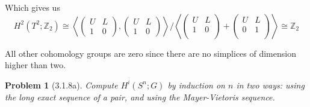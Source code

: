\documentclass[10pt]{article}
\newcommand{\sk}{\vskip 10mm}
\newcommand{\bb}[1]{\mathbb{#1}}
\theoremstyle{plain}
\newtheorem{problem}{Problem}
\theoremstyle{remark}
\begin{document}
Which gives us
\[
  H^2(T^2;\bb{Z}_2)\cong 
  \left\langle
    \left(
      \begin{array}{cc}
        U&L\\
        1&0
      \end{array}
    \right),
    \left(
      \begin{array}{cc}
        U&L\\
        1&0
      \end{array}
    \right)
  \right\rangle
  /
  \left\langle
    \left(
      \begin{array}{cc}
        U&L\\
        1&0\\
      \end{array}
    \right)
    +
    \left(
      \begin{array}{cc}
        U&L\\
        0&1\\
      \end{array}
    \right)
  \right\rangle
  \cong \bb{Z}_2
\]

All other cohomology groups are zero since there are no simplices
of dimension higher than two.

\sk

\begin{problem}[3.1.8a]
  Compute $H^i(S^n;G)$ by induction on $n$ in two ways: using the long exact
  sequence of a pair, and using the Mayer-Vietoris sequence.
\end{problem}
\end{document}
